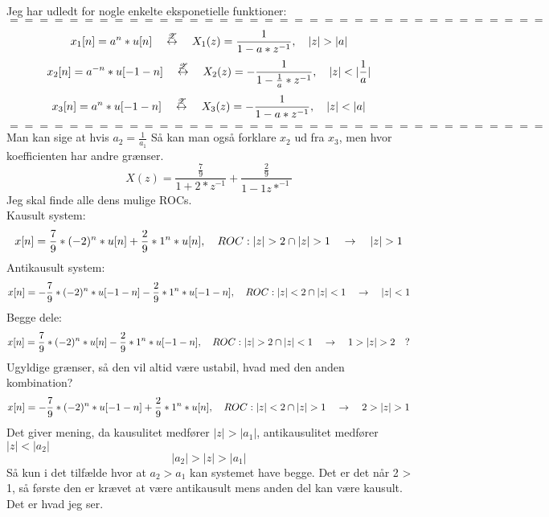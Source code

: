 \begin{Opgaver}
\begin{kapitel}
\begin{Opgave}
            \begin{UnderOpgave}[\text{$X(z) = \filterZ{1, -1/3}{1, 1, -2}$, Alle ROCs skal findes}]
                Jeg har udledt for nogle enkelte eksponetielle funktioner: 
                \[====================================                                                                                          \]
                \[x_1[n] = a^n*u[n] \quad\overset{\mathscr{Z}}{\leftrightarrow}\quad X_1(z) = \frac{1}{1 - a*z^{-1}}, \quad |z| > |a|                                          \]
                \[x_2[n] = a^{-n}*u[-1-n] \quad\overset{\mathscr{Z}}{\leftrightarrow}\quad X_2(z) = -\frac{1}{1 - \frac{1}{a}*z^{-1}}, \quad |z| < |\frac{1}{a}|                \]
                \[x_3[n] = a^n*u[-1-n] \transformation{Z} X_3(z) = - \frac{1}{1 - a*z^{-1}}, \tab |z|<|a|                                       \]
                \[====================================                                                                                          \]
                Man kan sige at hvis $a_2 = \frac{1}{a_1}$ Så kan man også forklare $x_2$ ud fra $x_3$, men hvor koefficienten har andre grænser. 
                \[X(z) = \frac{\frac{7}{9}}{1 + 2*z^{-1}} + \frac{\frac{2}{9}}{1 - 1z*^{-1}} \]
                Jeg skal finde alle dens mulige ROCs. \\
                Kausult system: 
                \[x[n] = \frac{7}{9} * (-2)^n * u[n]        + \frac{2}{9} * 1^n * u[n]   , \quad ROC: |z| > 2 \cap |z| > 1 \quad \rightarrow \quad |z| > 1\]
                Antikausult system: 
                \[x[n] = -\frac{7}{9} * (-2)^n * u[-1 -n]   - \frac{2}{9} * 1^n * u[-1-n], \quad ROC: |z| < 2 \cap |z| < 1 \quad \rightarrow \quad |z| < 1\]
                Begge dele: 
                \[x[n] = \frac{7}{9} * (-2)^n * u[n]        - \frac{2}{9} * 1^n * u[-1-n], \quad ROC: |z| > 2 \cap |z| < 1 \quad \rightarrow \quad 1 > |z| > 2 \quad ?\]
                Ugyldige grænser, så den vil altid være ustabil, hvad med den anden kombination? 
                \[x[n] = -\frac{7}{9} * (-2)^n * u[-1 -n]   + \frac{2}{9} * 1^n * u[n]   , \quad ROC: |z| < 2 \cap |z| > 1 \quad \rightarrow \quad 2 > |z| > 1\]
                Det giver mening, da kausulitet medfører $|z| > |a_1|$, antikausulitet medfører $|z| < |a_2|$
                \[|a_2| > |z| > |a_1|\]
                Så kun i det tilfælde hvor at $a_2 > a_1$ kan systemet have begge. Det er det når 2 > 1, så første den er krævet at være antikausult mens anden del kan være kausult. Det er hvad jeg ser. \\\\\\

\end{UnderOpgave}
\end{Opgave}
\end{kapitel}
\end{Opgaver}
